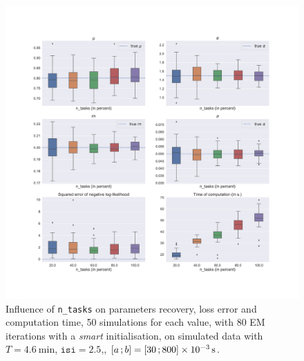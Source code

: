 \begin{figure}[h!]
    \centerfloat
    \includegraphics[width=1.28\textwidth]{pics/results/influence_of_n_tasks.pdf}
    \caption{Influence of \texttt{n\_tasks} on parameters recovery, loss error and computation time, 50 simulations for each value, with 80 EM iterations with a \textit{smart} initialisation, on simulated data with $T = \SI{4.6}{\minute}$, $\texttt{isi}=2.5$,, $\left[ a \, ; b \right] = \left[ 30 \, ; 800 \right]\times \SI{e-3}{\second}$.}
    \label{fig:influence_of_n_tasks}
\end{figure}

